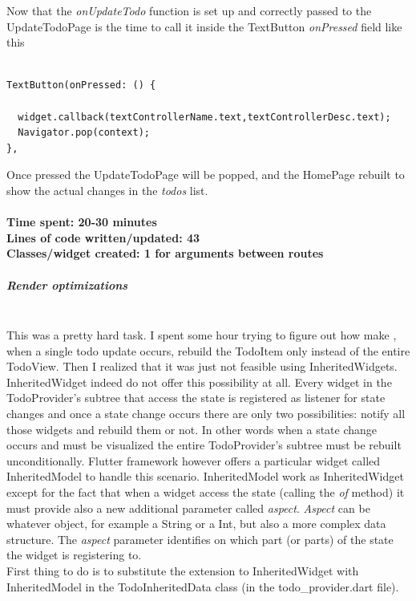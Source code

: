 Now that the \textit{onUpdateTodo } function is set up and correctly passed to the UpdateTodoPage is the time to call it inside the TextButton \textit{onPressed  }field like this
\mbox{}\\


\begin{verbatim}

TextButton(onPressed: () {

  widget.callback(textControllerName.text,textControllerDesc.text);
  Navigator.pop(context);
},
\end{verbatim}

Once pressed the UpdateTodoPage will be popped, and the HomePage rebuilt to show the actual changes in the \textit{todos }list.\\
\\
\textbf{Time spent: 20-30 minutes\\
Lines of code written/updated: 43\\ 
Classes/widget created: 1 for arguments between routes\\
}

\subparagraph{Render optimizations} \mbox{} \\
\label{subpar:render_optimizations_inherited_widget}
This was a pretty hard task. I spent some hour trying to figure out how make , when a single todo update occurs, rebuild the TodoItem only instead of the entire TodoView. Then I realized that it was just not feasible using InheritedWidgets. InheritedWidget indeed do not offer this possibility at all. Every widget in the TodoProvider’s subtree that access the state is registered as listener for state changes and once a state change occurs there are only two possibilities: notify all those widgets and rebuild them or not. In other words when a state change occurs and must be visualized the entire TodoProvider’s subtree must be rebuilt unconditionally. Flutter framework however offers a particular widget called InheritedModel to handle this scenario. InheritedModel work as InheritedWidget except for the fact that when a widget access the state (calling the \textit{of} method) it must provide also a new additional parameter called \textit{aspect}. \textit{Aspect} can be whatever object, for example a String or a Int, but also a more complex data structure. The \textit{aspect} parameter identifies on which part (or parts) of the state the widget is registering to. \\
First thing to do is to substitute the extension to InheritedWidget with InheritedModel in the
TodoInheritedData class (in the todo\_provider.dart file).
\mbox{}\\


